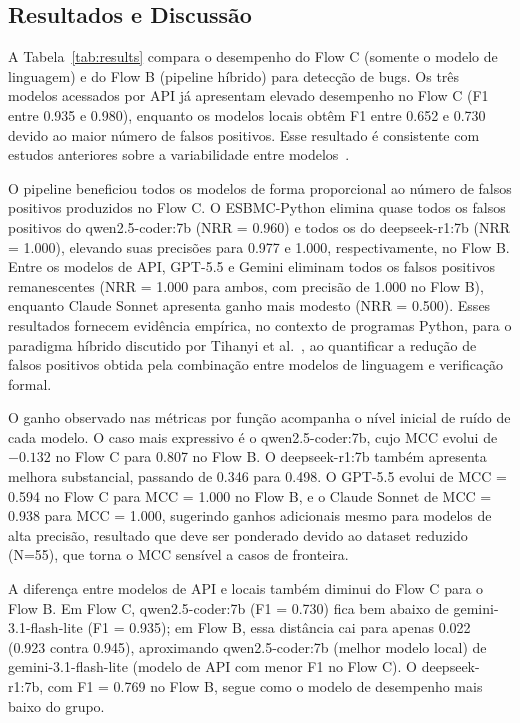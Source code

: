 \documentclass[sigconf]{acmart}
\begin{document}
\subsection{Resultados e Discussão}
\label{sec:resultados}

A Tabela~\ref{tab:results} compara o desempenho do Flow C (somente o modelo de linguagem) e do Flow B (pipeline híbrido) para detecção de bugs. Os três modelos acessados por API já apresentam elevado desempenho no Flow C (F1 entre 0.935 e 0.980), enquanto os modelos locais obtêm F1 entre 0.652 e 0.730 devido ao maior número de falsos positivos. Esse resultado é consistente com estudos anteriores sobre a variabilidade entre modelos~\cite{ullah2024secllmholmes,ding2025primevul}.

O pipeline beneficiou todos os modelos de forma proporcional ao número de falsos positivos produzidos no Flow C. O ESBMC-Python elimina quase todos os falsos positivos do qwen2.5-coder:7b (NRR = 0.960) e todos os do deepseek-r1:7b (NRR = 1.000), elevando suas precisões para 0.977 e 1.000, respectivamente, no Flow B. Entre os modelos de API, GPT-5.5 e Gemini eliminam todos os falsos positivos remanescentes (NRR = 1.000 para ambos, com precisão de 1.000 no Flow B), enquanto Claude Sonnet apresenta ganho mais modesto (NRR = 0.500). Esses resultados fornecem evidência empírica, no contexto de programas Python, para o paradigma híbrido discutido por Tihanyi et al.~\cite{tihanyi2025vulnerability}, ao quantificar a redução de falsos positivos obtida pela combinação entre modelos de linguagem e verificação formal.


O ganho observado nas métricas por função acompanha o nível inicial de ruído de cada modelo. O caso mais expressivo é o qwen2.5-coder:7b, cujo MCC evolui de $-0.132$ no Flow C para 0.807 no Flow B. O deepseek-r1:7b também apresenta melhora substancial, passando de 0.346 para 0.498. O GPT-5.5 evolui de MCC = 0.594 no Flow C para MCC = 1.000 no Flow B, e o Claude Sonnet de MCC = 0.938 para MCC = 1.000, sugerindo ganhos adicionais mesmo para modelos de alta precisão,
resultado que deve ser ponderado devido ao dataset reduzido (N=55), que torna o MCC sensível a casos de fronteira.

A diferença entre modelos de API e locais também diminui do Flow C para o Flow B. Em Flow C, qwen2.5-coder:7b (F1 = 0.730) fica bem abaixo de gemini-3.1-flash-lite (F1 = 0.935); em Flow B, essa distância cai para apenas 0.022 (0.923 contra 0.945), aproximando qwen2.5-coder:7b (melhor modelo local) de gemini-3.1-flash-lite (modelo de API com menor F1 no Flow C). O deepseek-r1:7b, com F1 = 0.769 no Flow B, segue como o modelo de desempenho mais baixo do grupo.
\end{document}

